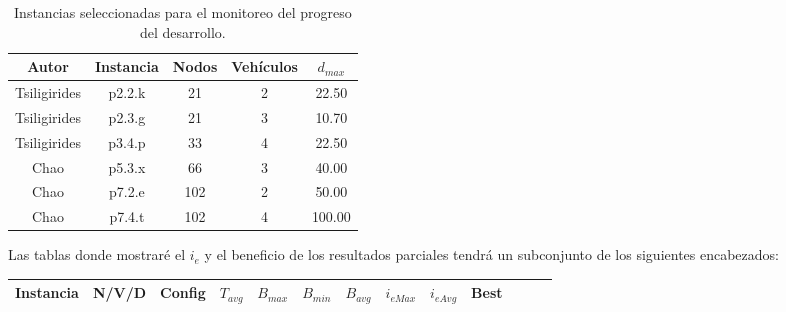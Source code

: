 \begin{table}
\begin{center}
\begin{tabular}
{ |c|c|c|c|c| } 
\hline
Autor & Instancia & Nodos & Vehículos & $d_{max}$ \\
\hline
Tsiligirides & p2.2.k & 21 & 2 & 22.50 \\
Tsiligirides & p2.3.g & 21 & 3 & 10.70 \\
Tsiligirides & p3.4.p & 33 & 4 & 22.50 \\
Chao & p5.3.x & 66 & 3 & 40.00 \\
Chao & p7.2.e & 102 & 2 & 50.00 \\
Chao & p7.4.t & 102 & 4 & 100.00 \\
\hline
\end{tabular}
\end{center}
\caption{Instancias seleccionadas para el monitoreo del progreso del desarrollo.}
\label{tab:instanciasDiversas}
\end{table}


\bigskip

Las tablas donde mostraré el $i_e$ y el beneficio de los resultados parciales tendrá un subconjunto de los siguientes encabezados:

\begin{center}
\begin{tabular}{ |c|c|c|c|c|c|c|c|c|c|c|c|c| } 
 \hline
Instancia & N/V/D & Config & $T_{avg}$ & $B_{max}$ & $B_{min}$ & $B_{avg}$ & $i_{eMax}$ & $i_{eAvg}$ & Best \\
\hline
\end{tabular}
\end{center}

\bigskip

